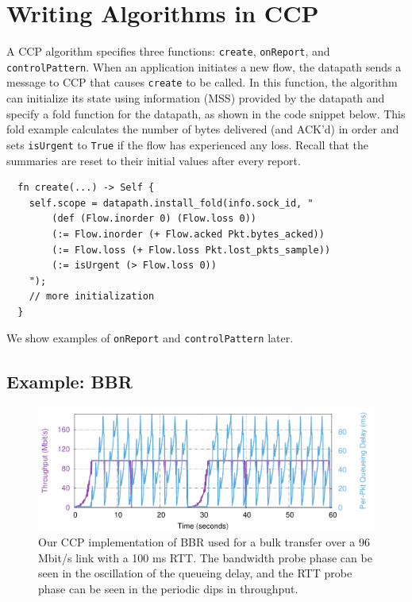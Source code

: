 \section{Writing Algorithms in CCP}
\label{sec:ccp}

A CCP algorithm specifies three functions: \texttt{create}, \texttt{onReport}, and \texttt{controlPattern}. When an application initiates a new flow, the datapath sends a message to CCP that causes \texttt{create} to be called. In this function, the algorithm can initialize its state using information (\eg MSS) provided by the datapath and specify a fold function for the datapath, as shown in the code snippet below. 
This fold example calculates the number of bytes delivered (and ACK'd) in order and sets \texttt{isUrgent} to \texttt{True} if the flow has experienced any loss. Recall that the summaries are reset to their initial values after every report.

{\footnotesize
\begin{verbatim}
  fn create(...) -> Self {
    self.scope = datapath.install_fold(info.sock_id, "
        (def (Flow.inorder 0) (Flow.loss 0))
        (:= Flow.inorder (+ Flow.acked Pkt.bytes_acked))
        (:= Flow.loss (+ Flow.loss Pkt.lost_pkts_sample))
        (:= isUrgent (> Flow.loss 0))
    ");
    // more initialization
  }
\end{verbatim}
}

We show examples of \texttt{onReport} and \texttt{controlPattern} later.


\subsection{Example: BBR}
\label{s:ccp:new-algorithms}
\begin{figure}[t]
\centering
    \includegraphics[width=\columnwidth]{img/bbr}
    \caption{
    Our CCP implementation of BBR used for a bulk transfer over a 96 Mbit/s link with a 100 ms RTT. The bandwidth probe phase can be seen in the oscillation of the queueing delay, and the RTT probe phase can be seen in the periodic dips in throughput.
    }\label{fig:ccp:bbr}
\end{figure}

